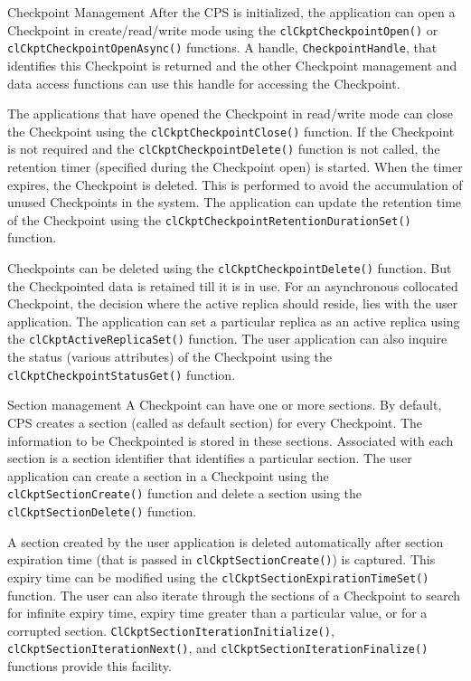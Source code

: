 \begin{flushleft}
\begin{Desc}
\item
[Checkpoint Management]
After the CPS is initialized, the application can open a Checkpoint in create/read/write mode using the {\tt{clCkptCheckpointOpen()}} or 
{\tt{clCkptCheckpointOpenAsync()}} functions. A handle, {\tt{CheckpointHandle}}, that identifies this Checkpoint is returned and the other Checkpoint management and 
data access functions can use this handle for accessing the Checkpoint.
\par
The applications that have opened the Checkpoint in read/write mode can close the Checkpoint using the {\tt{clCkptCheckpointClose()}} function. If the Checkpoint
is not required and the {\tt{clCkptCheckpointDelete()}} function is not called, the retention timer (specified during the Checkpoint open) is started. When the 
timer expires, the Checkpoint is deleted. This is performed to avoid the accumulation of unused Checkpoints in the system. The application can 
update the retention time of the Checkpoint using the {\tt{clCkptCheckpointRetentionDurationSet()}} function.
\par
Checkpoints can be deleted using the {\tt{clCkptCheckpointDelete()}} function. But the Checkpointed data is retained till it is in use. 
For an asynchronous collocated Checkpoint, the decision where the active replica should reside, lies with the user application. The application can set a
particular replica as an active replica using the {\tt{clCkptActiveReplicaSet()}} function. The user application can also inquire the status 
(various attributes) of the Checkpoint using the {\tt{clCkptCheckpointStatusGet()}} function.
\end{Desc}

\begin{Desc}
\item
[Section management]
A Checkpoint can have one or more sections. By default, CPS creates a section (called as default section) for every Checkpoint. The information to 
be Checkpointed is stored in these sections. Associated with each section is a section identifier that identifies a particular section. The 
user application can create a section in a Checkpoint using the {\tt{clCkptSectionCreate()}} function and delete a section using the 
{\tt{clCkptSectionDelete()}} function.
\par
A section created by the user application is deleted automatically after section expiration time (that is passed in 
{\tt{clCkptSectionCreate()}}) is captured. This expiry time can be modified using the {\tt{clCkptSectionExpirationTimeSet()}} function. The user 
can also iterate through the sections of a Checkpoint to search for infinite expiry time, expiry time greater than a particular value, or 
for a corrupted section. {\tt{ClCkptSectionIterationInitialize()}}, {\tt{clCkptSectionIterationNext()}}, and {\tt{clCkptSectionIterationFinalize()}} 
functions provide this facility.
\end{Desc}



\end{flushleft}
